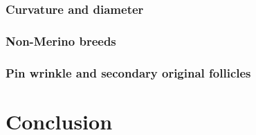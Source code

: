 \documentclass[titlepage]{article}  %
\begin{document}
\subsubsection{Curvature and diameter}

\subsubsection{Non-Merino breeds}

\subsubsection{Pin wrinkle and secondary original follicles}


\section{Conclusion}





\clearpage
\end{document}
